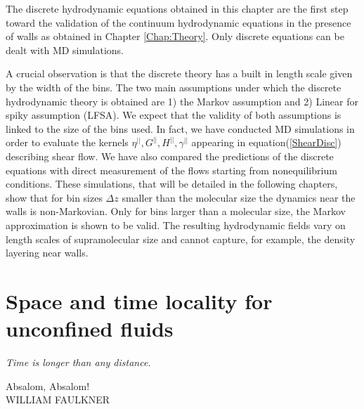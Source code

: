 \documentclass[b5paper,openright,10pt]{book}
\begin{document}
The discrete hydrodynamic equations obtained  in this chapter are
the first  step toward the  validation of the  continuum hydrodynamic
equations    in   the    presence    of   walls    as   obtained    in Chapter \ref{Chap:Theory}. Only discrete equations  can be dealt with MD
simulations. 

A  crucial observation  is that  the discrete  theory has  a built  in
length scale given by the width of the bins.  The two main assumptions
under which  the discrete hydrodynamic  theory is obtained are  1) the
Markov  assumption and  2)  Linear for  spiky  assumption (LFSA).   We
expect that the validity of both  assumptions is linked to the size of
the bins used.  In fact, we  have conducted MD simulations in order to
evaluate  the kernels  $\eta^{||},G^{||},H^{||},\gamma^{||}$ appearing
in equation(\ref{ShearDisc})  describing shear flow. We  have also compared
the predictions of  the discrete equations with  direct measurement of
the   flows   starting   from   nonequilibrium   conditions.    These
simulations, that will  be detailed in the following chapters, show that
for bin sizes $\Delta z$ smaller  than the molecular size the dynamics
near the walls is non-Markovian. Only for bins larger than a molecular
size,  the  Markov   approximation  is  shown  to   be  valid. 
The resulting  hydrodynamic fields vary on length  scales of supramolecular size and  cannot capture, for example, the density layering near walls.




\chapter{Space and time locality for unconfined fluids}\label{Chap:PBC}
\epigraph{\textit{Time is longer than any distance.}}{Absalom, Absalom! \\ WILLIAM FAULKNER}
\end{document}
